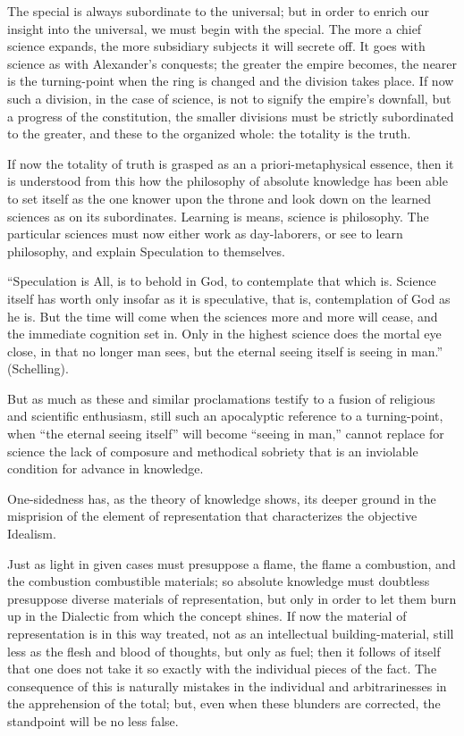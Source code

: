 \documentclass[12pt]{book}
\begin{document}
The special is always subordinate to the universal; but in order to enrich our insight into
the universal, we must begin with the special. The more a chief science expands, the more
subsidiary subjects it will secrete off. It goes with science as with Alexander's conquests;
the greater the empire becomes, the nearer is the turning-point when the ring is changed and
the division takes place. If now such a division, in the case of science, is not to signify
the empire's downfall, but a progress of the constitution, the smaller divisions must be
strictly subordinated to the greater, and these to the organized whole: the totality is the
truth.

If now the totality of truth is grasped as an a priori-metaphysical essence, then it is
understood from this how the
philosophy of absolute knowledge has been able to set itself as the one knower upon the
throne and look down on the learned sciences as on its subordinates. Learning is means,
science is philosophy. The particular sciences must now either work as day-laborers, or see
to learn philosophy, and explain Speculation to themselves.

``Speculation is All, is to behold in God, to contemplate that which is. Science itself has
worth only insofar as it is speculative, that is, contemplation of God as he is. But the
time will come when the sciences more and more will cease, and the immediate cognition set
in. Only in the highest science does the mortal eye close, in that no longer man sees, but
the eternal seeing itself is seeing in man.'' (Schelling).

But as much as these and similar proclamations testify to a fusion of religious and
scientific enthusiasm, still such an apocalyptic reference to a turning-point, when ``the
eternal seeing itself'' will become ``seeing in man,'' cannot replace for science the lack
of composure and methodical sobriety that is an inviolable condition for advance in
knowledge.

One-sidedness has, as the theory of knowledge shows, its deeper ground in the misprision of
the element of representation that characterizes the objective Idealism.

Just as light in given cases must presuppose a flame, the flame a combustion, and the
combustion combustible materials; so absolute knowledge must doubtless presuppose diverse
materials of representation, but only in order to let them burn up in the Dialectic from
which the concept shines. If now the material of representation is in this way treated, not
as an intellectual building-material, still less as the flesh and blood of thoughts, but
only as fuel; then it follows of itself that one does not take it so exactly with the
individual pieces of the fact.
The consequence of this is naturally mistakes in the individual and arbitrarinesses in the
apprehension of the total; but, even when these blunders are corrected, the standpoint will
be no less false.
\end{document}
